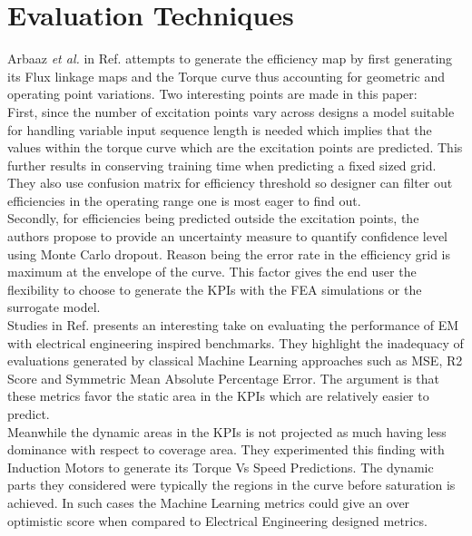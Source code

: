 \documentclass{report} %
\begin{document}
\section{Evaluation Techniques}\label{sec:LR Evaluation Techniques}
Arbaaz \textit{et al.} in Ref. \cite{DL-ETA-2019} attempts to generate the efficiency map by first generating its Flux linkage maps and the Torque curve 
thus accounting for geometric and operating point variations. Two interesting points are made in this paper:\\
First, since the number of excitation points vary across designs a model suitable for handling variable input sequence length is needed which implies that the values 
within the torque curve which are the excitation points are predicted. This further results in conserving training time when predicting a fixed sized grid.
They also use confusion matrix for efficiency threshold so designer can filter out efficiencies in the operating range one is most eager to find out.\\
Secondly, for efficiencies being predicted outside the excitation points, the authors propose to provide an uncertainty measure to quantify confidence level using 
Monte Carlo dropout. Reason being the error rate in the efficiency grid is maximum at the envelope of the curve. This factor gives the end user 
the flexibility to choose to generate the \ac{KPI}s with the \ac{FEA} simulations or the surrogate model.\\

Studies in Ref. \cite{EM-PM-2020} presents an interesting take on evaluating the performance of \ac{EM} with electrical engineering inspired benchmarks.
They highlight the inadequacy of evaluations generated by classical Machine Learning approaches such as \ac{MSE}, R2 Score and Symmetric Mean Absolute Percentage Error.
The argument is that these metrics favor the static area in the \ac{KPI}s which are relatively easier to predict.\\
Meanwhile the dynamic areas in the \ac{KPI}s is not projected as much having less dominance with respect to coverage area. They experimented this finding with 
Induction Motors to generate its Torque Vs Speed Predictions. The dynamic parts they considered were typically the regions in the curve before saturation is achieved. 
In such cases the Machine Learning metrics could give an over optimistic score when compared to Electrical Engineering designed metrics.\\
\end{document}
